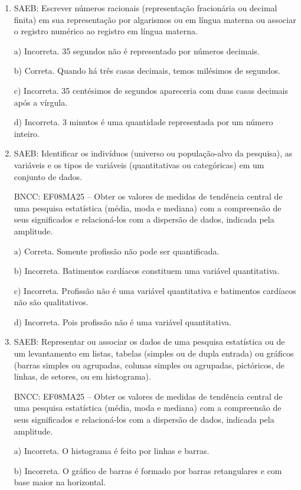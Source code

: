 \begin{enumerate}
\item SAEB: Escrever números racionais (representação fracionária ou decimal
finita) em sua representação por algarismos ou em língua materna ou
associar o registro numérico ao registro em língua materna.

a) Incorreta. 35 segundos não é representado por números decimais.

b) Correta. Quando há três casas decimais, temos milésimos de
segundos.

c) Incorreta. 35 centésimos de segundos apareceria com duas casas
decimais após a vírgula.

d) Incorreta. 3 minutos é uma quantidade representada por um número
inteiro.

\item SAEB: Identificar os indivíduos (universo ou população-alvo da
pesquisa), as variáveis e os tipos de variáveis (quantitativas ou
categóricas) em um conjunto de dados.

BNCC: EF08MA25 -- Obter os valores de medidas de tendência central de
uma pesquisa estatística (média, moda e mediana) com a compreensão de
seus significados e relacioná-los com a dispersão de dados, indicada
pela amplitude.

a) Correta. Somente profissão não pode ser quantificada.

b) Incorreta. Batimentos cardíacos constituem uma variável
quantitativa.

c) Incorreta. Profissão não é uma variável quantitativa e
batimentos cardíacos não são qualitativos.

d) Incorreta. Pois profissão não é uma variável quantitativa.

\item SAEB: Representar ou associar os dados de uma pesquisa estatística ou de
um levantamento em listas, tabelas (simples ou de dupla entrada) ou
gráficos (barras simples ou agrupadas, colunas simples ou agrupadas,
pictóricos, de linhas, de setores, ou em histograma).

BNCC: EF08MA25 -- Obter os valores de medidas de tendência central de
uma pesquisa estatística (média, moda e mediana) com a compreensão de
seus significados e relacioná-los com a dispersão de dados, indicada
pela amplitude.

a) Incorreta. O histograma é feito por linhas e barras.

b) Incorreta. O gráfico de barras é formado por barras retangulares
e com base maior na horizontal.


\end{enumerate}
